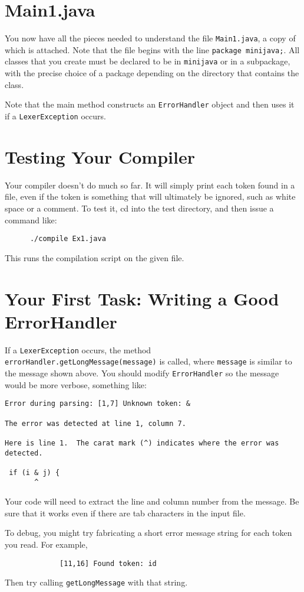 \documentclass[11pt]{article}
\begin{document}
\section{Main1.java}
You now have all the pieces needed to understand the file {\tt Main1.java}, a copy of which is attached.  Note that the file begins with the line \verb'package minijava;'.  All classes that you create must be declared to be in {\tt minijava} or in a subpackage, with the precise choice of a package depending on the directory that contains the class.

Note that the main method constructs an {\tt ErrorHandler} object and then uses it if a {\tt LexerException} occurs.

\section{Testing Your Compiler}
Your compiler doesn't do much so far.  It will simply print each token found in a file, even if the token is something that will ultimately be ignored, such as white space or a comment.  To test it,
cd into the test directory, and then issue a command like:
\begin{verbatim}
      ./compile Ex1.java
\end{verbatim}
This runs the compilation script on the given file.

\section{Your First Task:  Writing a Good ErrorHandler}

If a {\tt LexerException} occurs, the method {\tt errorHandler.getLongMessage(message)} is called, where {\tt message} is similar to the message shown above.  You should modify {\tt ErrorHandler} so the message would be more verbose, something like:
\begin{verbatim}
Error during parsing: [1,7] Unknown token: &

The error was detected at line 1, column 7.

Here is line 1.  The carat mark (^) indicates where the error was detected.

 if (i & j) {
       ^
\end{verbatim}
Your code will need to extract the line and column number from the message.  Be sure that it works even if there are tab characters in the input file.

To debug, you might try fabricating a short error message string for each token you read.  For example,
\begin{verbatim}
      	     [11,16] Found token: id
\end{verbatim}
Then try calling {\tt getLongMessage} with that string.
\end{document}
